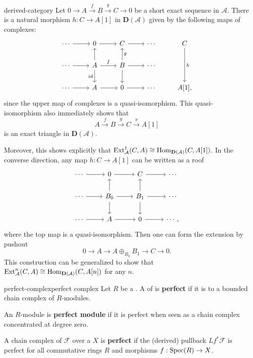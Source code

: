 \begin{example}{derived-category}
    Let $0 \to A \xrightarrow{f} B \xrightarrow{g} C \to 0$ be a short exact sequence in $\mathcal{A}$. There is a natural morphism $h : C \to A[1]$ in $\textbf{D}(\mathcal{A})$ given by the following maps of complexes:
    \[ \begin{tikzcd} \cdots \arrow{r} & 0 \arrow{r} & C \arrow{r} & \cdots & C \arrow{dd}{h} \\ \cdots \arrow{r} & A \arrow{u} \arrow[swap]{d}{\id} \arrow{r}{f} & B \arrow{d} \arrow[swap]{u}{g} \arrow{r} & \cdots & \\ \cdots \arrow{r} & A \arrow{r} & 0 \arrow{r} & \cdots & A[1] , \end{tikzcd} \]
    since the upper map of complexes is a quasi-isomorphism. This quasi-isomorphism also immediately shows that
    \[ A \xrightarrow{f} B \xrightarrow{g} C \xrightarrow{\pi} A[1] \]
    is an exact triangle in $\textbf{D}(\mathcal{A})$.
    
    Moreover, this shows explicitly that $\textup{Ext}_\mathcal{A}^1(C, A) \cong \operatorname{Hom}_{\textbf{D}(\mathcal{A})}(C, A[1])$. In the converse direction, any map $h : C \to A[1]$ can be written as a roof
    \[ \begin{tikzcd} \cdots \arrow{r} & 0 \arrow{r} & C \arrow{r} & \cdots \\ \cdots \arrow{r} & B_0 \arrow{u} \arrow{d} \arrow{r} & B_1 \arrow{d} \arrow{u} \arrow{r} & \cdots \\ \cdots \arrow{r} & A \arrow{r} & 0 \arrow{r} & \cdots , \end{tikzcd} \]
    where the top map is a quasi-isomorphism. Then one can form the extension by pushout 
    \[ 0 \to A \to A \oplus_{B_0} B_1 \to C \to 0 . \]
    This construction can be generalized to show that $\textup{Ext}_{\mathcal{A}}^n(C, A) \cong \operatorname{Hom}_{\textbf{D}(\mathcal{A})}(C, A[n])$ for any $n$.
\end{example}

    

\begin{topic}{perfect-complex}{perfect complex}
    Let $R$ be a . A  of  is \textbf{perfect} if it is  to a bounded chain complex of   $R$-modules.
    
    An $R$-module is \textbf{perfect module} if it is perfect when seen as a chain complex concentrated at degree zero.
    
    A chain complex of  $\mathcal{F}$ over a  $X$ is \textbf{perfect} if the (derived) pullback $L f^* \mathcal{F}$ is perfect for all commutative rings $R$ and morphisms $f : \operatorname{Spec}(R) \to X$.
\end{topic}

